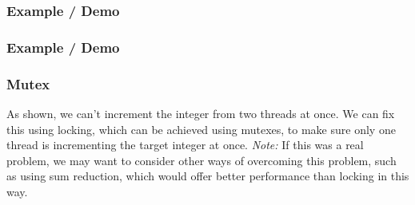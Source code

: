 \documentclass{beamer}
\begin{document}
\begin{frame}
  \frametitle{Example / Demo}
  
\end{frame}
\begin{frame}
  \frametitle{Example / Demo}
  
\end{frame}
\begin{frame}
  \frametitle{Mutex}
  As shown, we can't increment the integer from two threads at once. We can fix this using locking, which can be achieved using mutexes, to make sure only one thread is incrementing the target integer at once.\newline\newline
  \emph{Note:} If this was a real problem, we may want to consider other ways of overcoming this problem, such as using sum reduction, which would offer better performance than locking in this way.
\end{frame}
\end{document}
